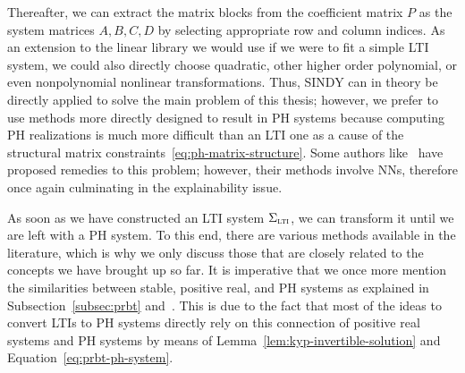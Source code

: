 Thereafter, we can extract the matrix blocks from the coefficient matrix $P$ as the system matrices $A, B, C, D$ by selecting appropriate row and column indices.
As an extension to the linear library we would use if we were to fit a simple \ac{LTI} system, we could also directly choose quadratic, other higher order polynomial, or even nonpolynomial nonlinear transformations.
Thus, \ac{SINDY} can in theory be directly applied to solve the main problem of this thesis; however, we prefer to use methods more directly designed to result in \ac{PH} systems because computing \ac{PH} realizations is much more difficult than an \ac{LTI} one as a cause of the structural matrix constraints~\eqref{eq:ph-matrix-structure}.
Some authors like~\cite{Lee2022} have proposed remedies to this problem; however, their methods involve \acp{NN}, therefore once again culminating in the explainability issue.

As soon as we have constructed an \ac{LTI} system $\Sigma_{\textnormal{\scshape lti}}$, we can transform it until we are left with a \ac{PH} system.
To this end, there are various methods available in the literature, which is why we only discuss those that are closely related to the concepts we have brought up so far.
It is imperative that we once more mention the similarities between stable, positive real, and \ac{PH} systems as explained in Subsection~\ref{subsec:prbt} and~\cite{Cherifi2022}.
This is due to the fact that most of the ideas to convert \acp{LTI} to \ac{PH} systems directly rely on this connection of positive real systems and \ac{PH} systems by means of Lemma~\ref{lem:kyp-invertible-solution} and Equation~\eqref{eq:prbt-ph-system}.

